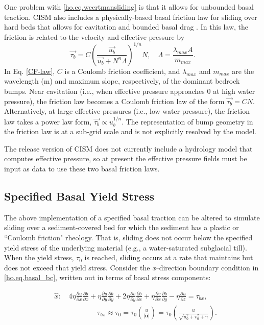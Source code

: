 One problem with \eqref{ho.eq.weertmansliding} is that it allows for unbounded basal traction.
CISM also includes a physically-based basal friction law for sliding over 
hard beds that allows for cavitation and bounded basal drag \citep[]{Schoof2005}.
In this law, the friction is related to the velocity and effective pressure by 
\begin{equation}
    \label{CF-law}
	  \vec{\tau_b} = C \left( \frac{ \vec{u_b} } { \vec{u_b} + N^n \Lambda} \right)^{1/n} N, \quad \Lambda=\frac{\lambda_{max}A}{m_{max}}.
\end{equation}
In Eq. \ref{CF-law}, $C$ is a Coulomb friction coefficient,  and $\lambda_{max}$ and 
$m_{max}$ are the wavelength (m) and maximum slope, respectively, of the 
dominant bedrock bumps.  Near cavitation (i.e., when effective pressure approaches 
0 at high water pressure), the friction law becomes a Coulomb friction law of the 
form $\vec{\tau_b}=CN$. Alternatively, at large effective pressures (i.e., low water pressure), 
the friction law takes a power law form, $\vec{\tau_b} \propto u_b^{1/n}$. 
The representation of bump geometry in the friction law is at a sub-grid scale 
and is not explicitly resolved by the model.

The release version of CISM does not currently include a hydrology model
that computes effective pressure, so at present the effective pressure fields must be
input as data to use these two basal friction laws.

\subsection{Specified Basal Yield Stress}
The above implementation of a specified basal traction can be altered to simulate sliding over a sediment-covered bed for which the sediment has a plastic or ``Coulomb friction" rheology. That is, sliding does not occur below the specified yield stress of the underlying material (e.g., a water-saturated subglacial till). When the yield stress, $\tau_0$ is reached, sliding occurs at a rate that maintains but does not exceed that yield stress. Consider the \textit{x}--direction boundary condition in \eqref{ho.eq.basal_bc}, written out in terms of basal stress components:

\begin{equation}
\begin{split}
  & \hat{x}:\quad 4\eta \frac{\partial u}{\partial x}\frac{\partial b}{\partial x}+\eta \frac{\partial u}{\partial y}\frac{\partial b}{\partial y}+2\eta \frac{\partial v}{\partial y}\frac{\partial b}{\partial x}+\eta \frac{\partial v}{\partial x}\frac{\partial b}{\partial y}-\eta \frac{\partial u}{\partial z}=\tau _{bx}, \\ 
 & \quad \quad \quad \quad \quad \quad \tau _{bx}\approx \tau _{0}=\tau _{0}\left( \frac{u}{\left| \mathbf{u} \right|} \right)=\tau _{0}\left( \frac{u}{\sqrt{u_{0}^{2}+v_{0}^{2}+\gamma }} \right). \\ 
\end{split}
\end{equation}

